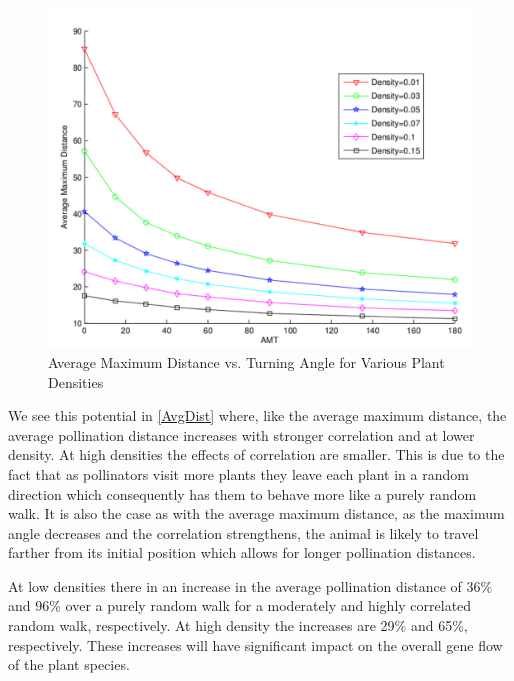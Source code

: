 \begin{figure}
  \begin{center}
  \includegraphics[scale=0.5]{Figures/MaxDVsAMT.pdf}
  \end{center}
  \caption{\small Average Maximum Distance vs. Turning Angle for Various Plant Densities}
  \label{AvgMaxDBees}
\end{figure}

We see this potential in \autoref{AvgDist} where, like the average maximum
distance, the average pollination distance increases with stronger correlation
and at lower density.  At high densities the effects of correlation are smaller.
This is due to the fact that as pollinators visit more plants they leave each
plant in a random direction which consequently has them to behave more like a
purely random walk.  It is also the case as with the average maximum distance,
as the maximum angle decreases and the correlation strengthens, the animal is
likely to travel farther from its initial position which allows for longer
pollination distances.

At low densities there in an increase in the average pollination distance of
36\% and 96\% over a purely random walk for a moderately and highly correlated
random walk, respectively.  At high density the increases are 29\% and 65\%,
respectively.  These increases will have significant impact on the overall gene
flow of the plant species.

